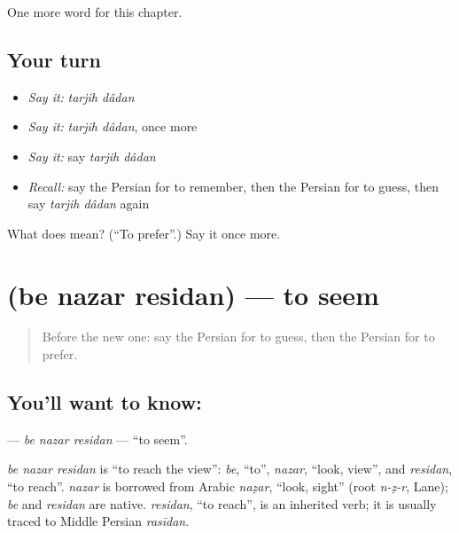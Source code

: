 \begin{grammarlens}[title={What you've built}]
One more word for this chapter.
\end{grammarlens}

\subsection*{Your turn}
\begin{itemize}
\raggedright
  \item \emph{Say it:} \emph{tarjih dâdan}
  \item \emph{Say it:} \emph{tarjih dâdan}, once more
  \item \emph{Say it:} say \emph{tarjih dâdan}
  \item \emph{Recall:} say the Persian for to remember, then the Persian for to guess, then say \emph{tarjih dâdan} again
\end{itemize}

\begin{tcolorbox}[breakable,colback=teal!4,colframe=teal!35!black,title={Before you move on}]
What does   mean? (\textquotedblleft{}To prefer\textquotedblright{}.) Say it once more.
\end{tcolorbox}
\section[\texorpdfstring{\fa{به} \fa{نظر} \fa{رسیدن} (be nazar residan)}{به نظر رسیدن (be nazar residan)}]{   (be nazar residan) — to seem}

\label{lesson:FA-C146-be-nazar-residan}



\begin{quote}
Before the new one: say the Persian for to guess, then the Persian for to prefer.
\end{quote}

\subsection*{You'll want to know:   }
\textbf{  } — \emph{be nazar residan} — \textquotedblleft{}to seem\textquotedblright{}.

\begin{cousinweb}
\emph{be nazar residan} is \textquotedblleft{}to reach the view\textquotedblright{}: \emph{be}, \textquotedblleft{}to\textquotedblright{}, \emph{nazar}, \textquotedblleft{}look, view\textquotedblright{}, and \emph{residan}, \textquotedblleft{}to reach\textquotedblright{}. \emph{nazar} is borrowed from Arabic \emph{naẓar}, \textquotedblleft{}look, sight\textquotedblright{} (root \emph{n-ẓ-r}, Lane); \emph{be} and \emph{residan} are native. \emph{residan}, \textquotedblleft{}to reach\textquotedblright{}, is an inherited verb; it is usually traced to Middle Persian \emph{rasīdan}.
\end{cousinweb}

